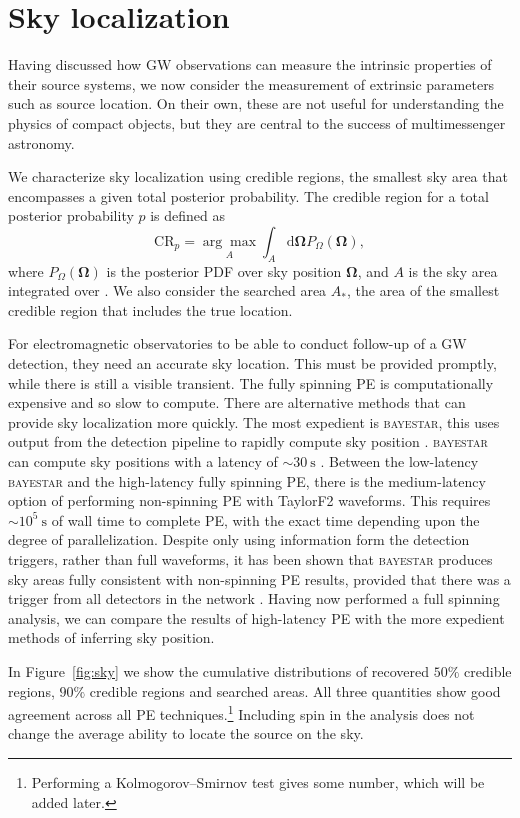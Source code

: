 \section{Sky localization}

Having discussed how GW observations can measure the intrinsic properties of their source systems, we now consider the measurement of extrinsic parameters such as source location. On their own, these are not useful for understanding the physics of compact objects, but they are central to the success of multimessenger astronomy.

We characterize sky localization using credible regions, the smallest sky area that encompasses a given total posterior probability. The credible region for a total posterior probability $p$ is defined as
\begin{equation}
\mathrm{CR}_p = \underset{A}{\arg\!\max} \int_A \mathrm{d}\boldsymbol{\Omega} P_{\Omega}(\boldsymbol{\Omega}),
\label{eq:CR}
\end{equation}
where $P_{\Omega}(\boldsymbol{\Omega})$ is the posterior PDF over sky position $\boldsymbol{\Omega}$, and $A$ is the sky area integrated over \citep{Sidery_2014}. We also consider the searched area $A_\ast$, the area of the smallest credible region that includes the true location.

For electromagnetic observatories to be able to conduct follow-up of a GW detection, they need an accurate sky location. This must be provided promptly, while there is still a visible transient. The fully spinning PE is computationally expensive and so slow to compute. There are alternative methods that can provide sky localization more quickly. The most expedient is \textsc{bayestar}, this uses output from the detection pipeline to rapidly compute sky position \citep{Singer_2014}. \textsc{bayestar} can compute sky positions with a latency of $\sim30~\mathrm{s}$ \citep{Berry_2014}. Between the low-latency \textsc{bayestar} and the high-latency fully spinning PE, there is the medium-latency option of performing non-spinning PE with TaylorF2 waveforms. This requires $\sim10^5~\mathrm{s}$ of wall time to complete PE, with the exact time depending upon the degree of parallelization. Despite only using information form the detection triggers, rather than full waveforms, it has been shown that \textsc{bayestar} produces sky areas fully consistent with non-spinning PE results, provided that there was a trigger from all detectors in the network \citep{Singer_2014,Berry_2014}. Having now performed a full spinning analysis, we can compare the results of high-latency PE with the more expedient methods of inferring sky position.

In Figure~\ref{fig:sky} we show the cumulative distributions of recovered $50\%$ credible regions, $90\%$ credible regions and searched areas. All three quantities show good agreement across all PE techniques.\footnote{Performing a Kolmogorov--Smirnov test gives some number, which will be added later.} Including spin in the analysis does not change the average ability to locate the source on the sky.

